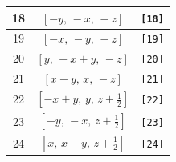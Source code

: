\documentclass[fleqn,8pt]{jsarticle}
\begin{document}
\begin{longtable}{ccc}
18 & $\left[ - y,\, - x,\, - z \right]$ & {\tt [18]} \\ \hline
19 & $\left[ - x,\, - y,\, - z \right]$ & {\tt [19]} \\ \hline
20 & $\left[ y,\, - x + y,\, - z \right]$ & {\tt [20]} \\ \hline
21 & $\left[ x - y,\, x,\, - z \right]$ & {\tt [21]} \\ \hline
22 & $\left[ - x + y,\, y,\, z + \frac{1}{2} \right]$ & {\tt [22]} \\ \hline
23 & $\left[ - y,\, - x,\, z + \frac{1}{2} \right]$ & {\tt [23]} \\ \hline
24 & $\left[ x,\, x - y,\, z + \frac{1}{2} \right]$ & {\tt [24]} \\
\end{longtable}
\end{document}
